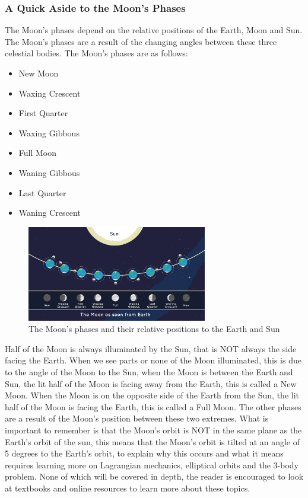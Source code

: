 \documentclass[12pt,oneside,a4paper,english]{article}
\begin{document}
\subsubsection{A Quick Aside to the Moon's Phases}
The Moon's phases depend on the relative positions of the Earth, Moon and Sun. The Moon's phases are a result of the changing angles between these three celestial bodies. The Moon's phases are as follows:
\begin{itemize}
    \item New Moon
    \item Waxing Crescent
    \item First Quarter
    \item Waxing Gibbous
    \item Full Moon
    \item Waning Gibbous
    \item Last Quarter
    \item Waning Crescent
\end{itemize}
\begin{figure}[H]
    \centering
    \includegraphics[width=0.7\textwidth]{moon-phases.en.png}
    \caption{The Moon's phases and their relative positions to the Earth and Sun\cite{moonphase}}
    \label{fig:moon_phases}
\end{figure}
Half of the Moon is always illuminated by the Sun, that is NOT always the side facing the Earth. When we see parts or none of the Moon illuminated, this is due to the angle of the Moon to the Sun, when the Moon is between the Earth and Sun, the lit half of the Moon is facing away from the Earth, this is called a New Moon. When the Moon is on the opposite side of the Earth from the Sun, the lit half of the Moon is facing the Earth, this is called a Full Moon. The other phases are a result of the Moon's position between these two extremes. What is important to remember is that the Moon's orbit is NOT in the same plane as the Earth's orbit of the sun, this means that the Moon's orbit is tilted at an angle of 5 degrees to the Earth's orbit, to explain why this occurs and what it means requires learning more on Lagrangian mechanics, elliptical orbits and the 3-body problem. None of which will be covered in depth, the reader is encouraged to look at textbooks and online resources to learn more about these topics.
\end{document}
